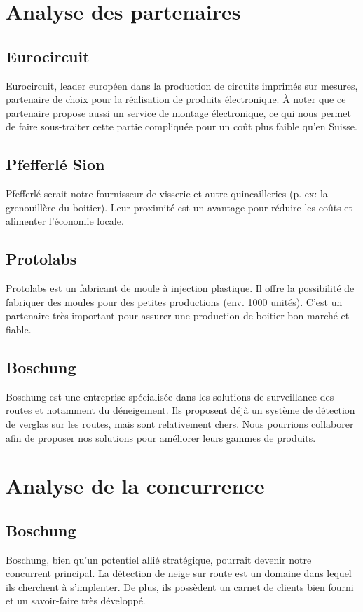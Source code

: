 \section{Analyse des partenaires}
\subsection{Eurocircuit}
Eurocircuit, leader européen dans la production de circuits imprimés sur mesures,
partenaire de choix pour la réalisation de produits électronique.
À noter que ce partenaire propose aussi un service de montage électronique,
ce qui nous permet de faire sous-traiter cette partie compliquée pour
un coût plus faible qu'en Suisse.

\subsection{Pfefferlé Sion}
Pfefferlé serait notre fournisseur de visserie et autre quincailleries (p. ex: la grenouillère du boitier).
Leur proximité est un avantage pour réduire les coûts et alimenter l'économie locale.

\subsection{Protolabs}
Protolabs est un fabricant de moule à injection plastique. Il offre la possibilité de fabriquer des
moules pour des petites productions (env. 1000 unités).
C'est un partenaire très important pour assurer une production de boitier bon marché et fiable.

\subsection{Boschung}
Boschung est une entreprise spécialisée dans les solutions de surveillance des routes et
notamment du déneigement. Ils proposent déjà un système de détection de verglas
sur les routes, mais sont relativement chers. Nous pourrions collaborer
afin de proposer nos solutions pour améliorer leurs gammes de produits.

\section{Analyse de la concurrence}
\subsection{Boschung}
Boschung, bien qu'un potentiel allié stratégique, pourrait devenir notre concurrent
principal. La détection de neige sur route est un domaine dans lequel ils cherchent à
s'implenter. De plus, ils possèdent un carnet de clients bien fourni et un savoir-faire
très développé.

